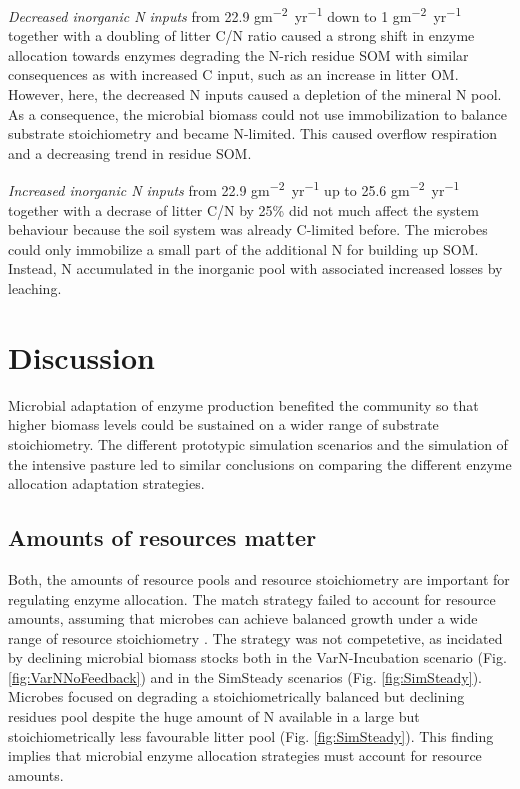 \textit{Decreased inorganic N inputs} from 22.9
\unit{gm^{-2}yr^{-1}} down to 1
\unit{gm^{-2}yr^{-1}} together with a doubling of litter C/N
ratio caused a strong shift in enzyme allocation towards enzymes degrading the
N-rich residue SOM with similar consequences as with increased C input,
such as an increase in litter OM. However, here, the decreased N inputs caused
a depletion of the mineral N pool.
As a consequence, the microbial biomass could not use immobilization to
balance substrate stoichiometry and became N-limited.
This caused overflow respiration and a decreasing trend in residue SOM.

\textit{Increased inorganic N inputs} from 22.9 \unit{gm^{-2}yr^{-1}} up to 25.6
\unit{gm^{-2}yr^{-1}} together with a decrase of litter C/N by 25\% did not
much affect the system behaviour because the soil system was already C-limited
before.
The microbes could only immobilize a small part of the additional N for building
up SOM. Instead, N accumulated in the inorganic pool with associated
increased losses by leaching.


\section{Discussion}
Microbial adaptation of enzyme production benefited the community so that higher
biomass levels could be sustained on a wider range of substrate stoichiometry.
The different prototypic simulation scenarios and the simulation of the
intensive pasture led to similar conclusions on comparing the different enzyme
allocation adaptation strategies.

\subsection{Amounts of resources matter}
Both, the amounts of resource pools and resource stoichiometry are important for
regulating enzyme allocation. The match strategy failed to account for resource
amounts, assuming that microbes can achieve balanced growth under a wide
range of resource stoichiometry \citep{Moorhead12, Ballantyne14}. The strategy
was not competetive, as incidated by declining microbial biomass stocks both in
the VarN-Incubation scenario (Fig. \ref{fig:VarNNoFeedback}) and in the
SimSteady scenarios (Fig. \ref{fig:SimSteady}). Microbes focused on degrading a
stoichiometrically balanced but declining residues pool despite the huge amount
of N available in a large but stoichiometrically less favourable litter pool
(Fig. \ref{fig:SimSteady}). This finding implies that microbial enzyme
allocation strategies must account for resource amounts.

